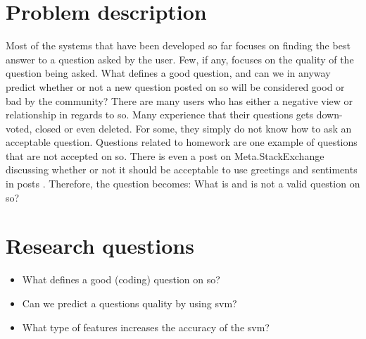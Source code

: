 \section{Problem description}
\label{sec:problem_description}
Most of the systems that have been developed so far focuses on finding the best answer to a question asked by the user. 
Few, if any, focuses on the quality of the question being asked. 
What defines a good question, and can we in anyway predict whether or not a new question posted on \gls{so} will be considered good or bad by the community?
There are many users who has either a negative view or relationship in regards to \gls{so}.
Many experience that their questions gets down-voted, closed or even deleted. 
For some, they simply do not know how to ask an acceptable question.
Questions related to homework are one example of questions that are not accepted on \gls{so}.
There is even a post on Meta.StackExchange discussing whether or not it should be acceptable to use greetings and sentiments in posts \cite{CommunityWiki2016a}.
Therefore, the question becomes: What is and is not a valid question on \gls{so}?

\section{Research questions}
\label{sec:research_questions}

\begin{itemize}
	\item What defines a good (coding) question on \gls{so}?
	\item Can we predict a questions quality by using \gls{svm}?
	\item What type of features increases the accuracy of the \gls{svm}?
\end{itemize}

